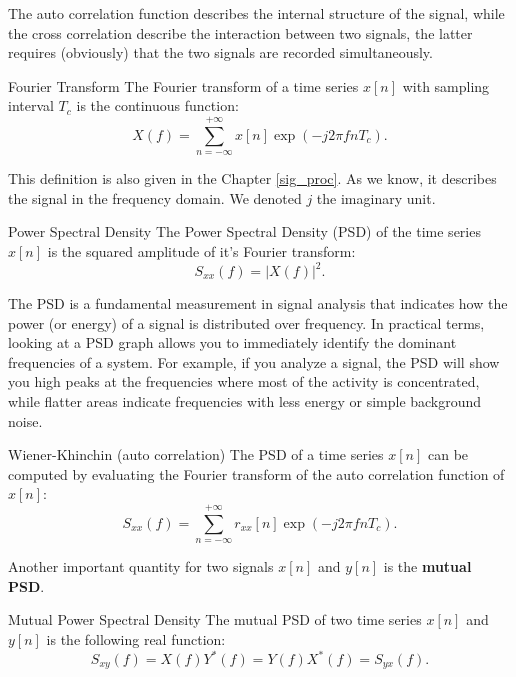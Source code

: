 \documentclass[10pt, letterpaper]{report}
\begin{document}
The auto correlation function describes the internal structure of the signal, while the cross correlation describe the interaction between two signals, the latter requires (obviously) that the two signals are recorded simultaneously.
\begin{boxdefinition}{Fourier Transform}{}
     The Fourier transform of a time series $x[n]$ with sampling interval $T_c$ is the continuous function:\begin{equation}
          X(f)=\sum_{n=-\infty}^{+\infty}x[n]\exp(-j2\pi fnT_c).
     \end{equation}
\end{boxdefinition}
This definition is also given in the Chapter \ref{sig_proc}. As we know, it describes the signal in the frequency domain. We denoted $j$ the imaginary unit.
\begin{boxdefinition}{Power Spectral Density}{}
     The Power Spectral Density (PSD) of the time series $x[n]$ is the squared amplitude of it's Fourier transform:\begin{equation}
          S_{xx}(f)=|X(f)|^2.
     \end{equation}
\end{boxdefinition}
The PSD is a fundamental measurement in signal analysis that indicates how the power (or energy) of a signal is distributed over frequency.
In practical terms, looking at a PSD graph allows you to immediately identify the dominant frequencies of a system. For example, if you analyze a signal, the PSD will show you high peaks at the frequencies where most of the activity is concentrated, while flatter areas indicate frequencies with less energy or simple background noise.
\begin{boxtheorem}{Wiener-Khinchin (auto correlation)}{}
     The PSD of a time series $x[n]$ can be computed by evaluating the Fourier transform of the auto correlation function of $x[n]$:\begin{equation}
          S_{xx}(f)=\sum_{n=-\infty}^{+\infty}r_{xx}[n]\exp(-j2\pi fnT_c).
     \end{equation}
\end{boxtheorem}
\noindent Another important quantity for two signals $x[n]$ and $y[n]$ is the \textbf{mutual PSD}.\begin{boxdefinition}{Mutual Power Spectral Density}{}
     The mutual PSD of two time series  $x[n]$ and $y[n]$ is the following real function:\begin{equation}
          S_{xy}(f)=X(f)Y^*(f)=Y(f)X^*(f)=S_{yx}(f).
     \end{equation}
\end{boxdefinition}
\end{document}

